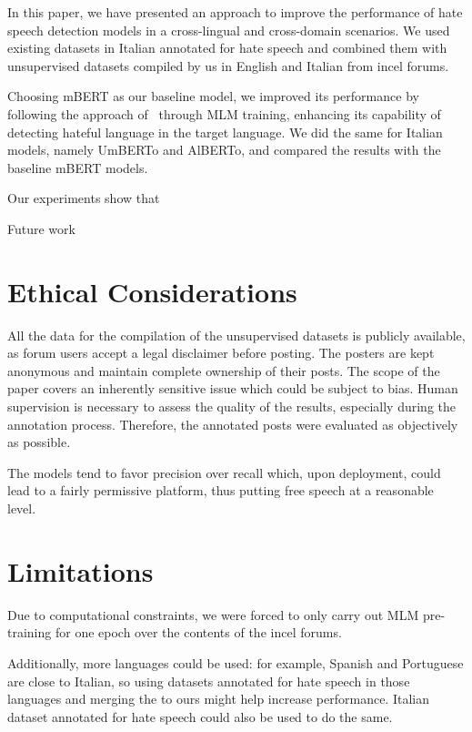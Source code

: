 \documentclass[11pt]{article}
\begin{document}
In this paper, we have presented an approach to improve the performance of hate speech detection models in a cross-lingual and cross-domain scenarios. We used existing datasets in Italian annotated for hate speech and combined them with unsupervised datasets compiled by us in English and Italian from incel forums.

Choosing mBERT as our baseline model, we improved its performance by following the approach of~ through MLM training, enhancing its capability of detecting hateful language in the target language. We did the same for Italian models, namely UmBERTo and AlBERTo, and compared the results with the baseline mBERT models.

Our experiments show that 

Future work 

\section*{Ethical Considerations}
All the data for the compilation of the unsupervised datasets is publicly available, as forum users accept a legal disclaimer before posting. The posters are kept anonymous and maintain complete ownership of their posts. 
% 
The scope of the paper covers an inherently sensitive issue which could be subject to bias. Human supervision is necessary to assess the quality of the results, especially during the annotation process. Therefore, the annotated posts were evaluated as objectively as possible.

The models tend to favor precision over recall which, upon deployment, 
could lead to a fairly permissive platform, thus putting free speech 
at a reasonable level.

\section*{Limitations}

Due to computational constraints, we were forced to only carry out MLM pre-training for one epoch over the contents of the incel forums. 

Additionally, more languages could be used: for example, Spanish and Portuguese are close to Italian, so using datasets annotated for hate speech in those languages and merging the to ours might help increase performance. Italian dataset annotated for hate speech could also be used to do the same.

\end{document}
